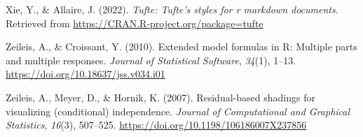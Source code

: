 \documentclass[
  english,
  man]{apa6}
\newlength{\cslhangindent}
\newlength{\cslentryspacingunit} %
\newenvironment{CSLReferences}[2] %
 {%
  \setlength{\parindent}{0pt}
  \ifodd #1
  \let\oldpar\par
  \def\par{\hangindent=\cslhangindent\oldpar}
  \fi
  \setlength{\parskip}{#2\cslentryspacingunit}
 }%
 {}
\begin{document}
\begin{CSLReferences}{1}{0}
\leavevmode{}%
Xie, Y., \& Allaire, J. (2022). \emph{Tufte: Tufte's styles for r markdown documents}. Retrieved from \url{https://CRAN.R-project.org/package=tufte}

\leavevmode{}%
Zeileis, A., \& Croissant, Y. (2010). Extended model formulas in {R}: Multiple parts and multiple responses. \emph{Journal of Statistical Software}, \emph{34}(1), 1--13. \url{https://doi.org/10.18637/jss.v034.i01}

\leavevmode{}%
Zeileis, A., Meyer, D., \& Hornik, K. (2007). Residual-based shadings for visualizing (conditional) independence. \emph{Journal of Computational and Graphical Statistics}, \emph{16}(3), 507--525. \url{https://doi.org/10.1198/106186007X237856}

\end{CSLReferences}
\end{document}
